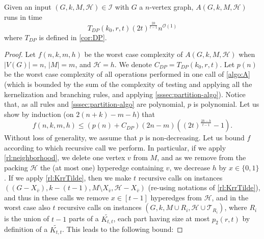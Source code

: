 \documentclass{amsart}
\newcommand{\I}{\mathcal{I}}
\newcommand{\mT}{\mathcal{T}}
\newcommand{\mH}{\mathcal{H}}
\newcommand{\KttTilde}{\widetilde{K_{t,t}}}
\newcommand{\tdp}{T_{DP}}
\newcommand{\ruleref}[1]{\hyperref[#1]{\ref*{#1}}}
\renewcommand{\O}{\mathcal{O}}
\begin{document}
\begin{lemma}\label{lm:complexityA}
Given an input $(G,k,M,\mH)\in \I$ with $G$ a $n$-vertex graph, $A(G,k,M,\mH)$ runs in time
$$\tdp\left(k_0,r,t\right)(2t)^{\frac{2k}{t-1}}n^{\O(1)}$$ where $\tdp$ is defined in \autoref{cor:DP}.
\end{lemma}
\begin{proof}
Let $f(n,k,m,h)$ be the worst case complexity of 
$A(G,k,M,\mH)$ when $|V(G)|=n$, $|M|=m$, and $\mH=h$. We denote $C_{DP}=\tdp\left(k_0,r,t\right)$.
Let $p(n)$ be the worst case complexity of all operations performed in one call of \autoref{algo:A} (which is bounded by the sum of the complexity of testing and applying all the kernelization and branching rules, and applying  \autoref{sssec:partition-algo}). Notice that, as all rules and 
\autoref{sssec:partition-algo} are polynomial, $p$ is polynomial.
Let us show by induction (on $2(n+k)-m-h$) that 
$$f(n,k,m,h) \le (p(n)+C_{DP})(2n-m)\left((2t)^{\frac{2k-h}{t-1}}-1\right).$$
Without loss of generality, we assume that $p$ is non-decreasing.
Let us bound $f$ according to which recursive call we perform. 
In particular, if we apply \ruleref{rl:neighborhood}, 
we delete one vertex $v$ from $M$, and as we remove from the packing $\mH$ the (at most one) hyperedge containing $v$, we decrease $h$ by $x \in \{0,1\}$.
If we apply \ruleref{rl:KrrTilde}, then we make $t$
recursive calls on instances  $((G-X_{\overline{v}}), k-(t-1), M\setminus X_{\overline{v}}, \mH-X_{\overline{v}})$ (re-using notations of \ruleref{rl:KrrTilde}), and thus in these calls we remove $x \in [t-1]$ hyperedges from $\mH$, 
and in the worst case also $t$ recursive calls on instances $\left(G, k, M\cup R_i, \mH\cup \mT_{R_i}\right)$, where $R_i$ is the union of $t-1$ parts of a $\KttTilde$, each part having size at most $p_2(r,t)$ by definition of a $\KttTilde$.
This leads to the following bound:


\end{proof}
\end{document}
